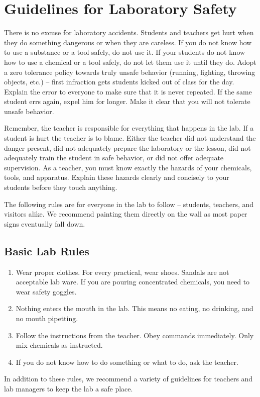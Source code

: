 \chapter{Guidelines for Laboratory Safety}

There is no excuse for laboratory accidents. 
Students and teachers get hurt when they do something dangerous 
or when they are careless. 
If you do not know how to use a substance or a tool safely, do not use it. 
If your students do not know how to use a chemical or a tool safely, 
do not let them use it until they do. 
Adopt a zero tolerance policy towards truly unsafe behavior 
(running, fighting, throwing objects, etc.) -- 
first infraction gets students kicked out of class for the day. 
Explain the error to everyone to make sure that it is never repeated. 
If the same student errs again, expel him for longer. 
Make it clear that you will not tolerate unsafe behavior.

Remember, the teacher is responsible for everything that happens in the lab. 
If a student is hurt the teacher is to blame. 
Either the teacher did not understand the danger present, 
did not adequately prepare the laboratory or the lesson, 
did not adequately train the student in safe behavior, 
or did not offer adequate supervision. 
As a teacher, you must know exactly the hazards of your chemicals, 
tools, and apparatus. 
Explain these hazards clearly and concisely to your students 
before they touch anything.

The following rules are for everyone in the lab to follow -- 
students, teachers, and visitors alike. 
We recommend painting them directly on the wall 
as most paper signs eventually fall down.

\section{Basic Lab Rules}
\label{sec:basiclabrules}
\begin{enumerate}
\item{Wear proper clothes. For every practical, wear shoes. 
Sandals are not acceptable lab ware. 
If you are pouring concentrated chemicals, you need to wear safety goggles.}
\item{Nothing enters the mouth in the lab. 
This means no eating, no drinking, and no mouth pipetting.}
\item{Follow the instructions from the teacher. 
Obey commands immediately. 
Only mix chemicals as instructed.}
\item{If you do not know how to do something or what to do, ask the teacher.}
\end{enumerate}
In addition to these rules, 
we recommend a variety of guidelines for teachers and lab managers 
to keep the lab a safe place.
\renewcommand{\theenumii}
{\arabic{enumi}.\arabic{enumii}.}
\renewcommand{\labelenumii}{\theenumii}
\renewcommand{\theenumiii}
{\arabic{enumi}.\arabic{enumii}.\arabic{enumiii}.}
\renewcommand{\labelenumiii}{\theenumiii}
\renewcommand{\theenumiv}
{\arabic{enumi}.\arabic{enumii}.\arabic{enumiii}.\arabic{enumiv}.}
\renewcommand{\labelenumiv}{\theenumiv}

